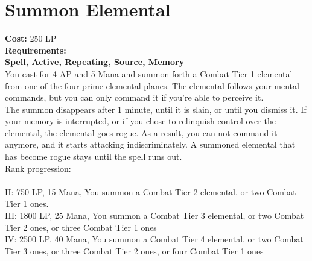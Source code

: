 \section{Summon Elemental}\label{spell:summonElemental}
\textbf{Cost:} 250 LP\\
\textbf{Requirements:} \\
\textbf{Spell, Active, Repeating, Source, Memory}\\
You cast for 4 AP and 5 Mana and summon forth a Combat Tier 1 elemental from one of the four prime elemental planes.
The elemental follows your mental commands, but you can only command it if you're able to perceive it.\\
The summon disappears after 1 minute, until it is slain, or until you dismiss it.
If your memory is interrupted, or if you chose to relinquish control over the elemental, the elemental goes rogue.
As a result, you can not command it anymore, and it starts attacking indiscriminately.
A summoned elemental that has become rogue stays until the spell runs out.
\\
Rank progression:\\
\\
II: 750 LP, 15 Mana, You summon a Combat Tier 2 elemental, or two Combat Tier 1 ones.\\
III: 1800 LP, 25 Mana, You summon a Combat Tier 3 elemental, or two Combat Tier 2 ones, or three Combat Tier 1 ones\\
IV: 2500 LP, 40 Mana, You summon a Combat Tier 4 elemental, or two Combat Tier 3 ones, or three Combat Tier 2 ones, or four Combat Tier 1 ones\\